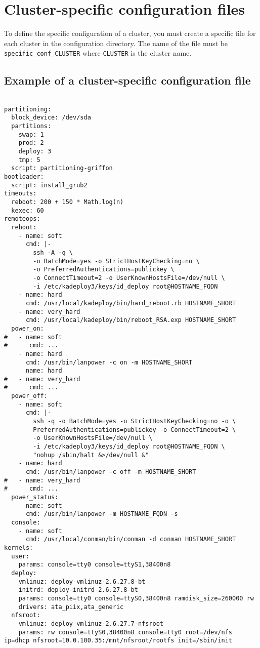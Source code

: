 \documentclass[a4wide,10pt,oneside]{book}
\begin{document}
\section{Cluster-specific configuration files}\label{sec:specific_config}
To define the specific configuration of a cluster, you must create a specific file for each cluster in the configuration directory. The name of the file must be \texttt{specific\_conf\_CLUSTER} where \texttt{CLUSTER} is the cluster name.
\subsection{Example of a cluster-specific configuration file}
\begin{small}
\begin{verbatim}
--- 
partitioning: 
  block_device: /dev/sda
  partitions:
    swap: 1
    prod: 2
    deploy: 3
    tmp: 5
  script: partitioning-griffon
bootloader:
  script: install_grub2
timeouts: 
  reboot: 200 + 150 * Math.log(n)
  kexec: 60
remoteops: 
  reboot: 
    - name: soft
      cmd: |-
        ssh -A -q \
        -o BatchMode=yes -o StrictHostKeyChecking=no \
        -o PreferredAuthentications=publickey \
        -o ConnectTimeout=2 -o UserKnownHostsFile=/dev/null \
        -i /etc/kadeploy3/keys/id_deploy root@HOSTNAME_FQDN
    - name: hard
      cmd: /usr/local/kadeploy/bin/hard_reboot.rb HOSTNAME_SHORT
    - name: very_hard
      cmd: /usr/local/kadeploy/bin/reboot_RSA.exp HOSTNAME_SHORT
  power_on:
#   - name: soft
#      cmd: ...
    - name: hard
      cmd: /usr/bin/lanpower -c on -m HOSTNAME_SHORT
      name: hard
#   - name: very_hard
#      cmd: ...
  power_off: 
    - name: soft
      cmd: |-
        ssh -q -o BatchMode=yes -o StrictHostKeyChecking=no -o \
        PreferredAuthentications=publickey -o ConnectTimeout=2 \
        -o UserKnownHostsFile=/dev/null \
        -i /etc/kadeploy3/keys/id_deploy root@HOSTNAME_FQDN \
        "nohup /sbin/halt &>/dev/null &"
    - name: hard
      cmd: /usr/bin/lanpower -c off -m HOSTNAME_SHORT
#   - name: very_hard
#      cmd: ...
  power_status: 
    - name: soft
      cmd: /usr/bin/lanpower -m HOSTNAME_FQDN -s
  console: 
    - name: soft
      cmd: /usr/local/conman/bin/conman -d conman HOSTNAME_SHORT
kernels:
  user: 
    params: console=tty0 console=ttyS1,38400n8
  deploy:
    vmlinuz: deploy-vmlinuz-2.6.27.8-bt
    initrd: deploy-initrd-2.6.27.8-bt
    params: console=tty0 console=ttyS0,38400n8 ramdisk_size=260000 rw
    drivers: ata_piix,ata_generic
  nfsroot:
    vmlinuz: deploy-vmlinuz-2.6.27.7-nfsroot
    params: rw console=ttyS0,38400n8 console=tty0 root=/dev/nfs ip=dhcp nfsroot=10.0.100.35:/mnt/nfsroot/rootfs init=/sbin/init

\end{verbatim}
\end{small}
\end{document}
